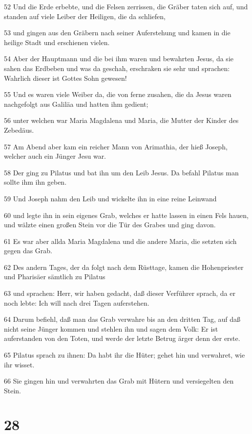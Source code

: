 \par 52 Und die Erde erbebte, und die Felsen zerrissen, die Gräber taten sich auf, und standen auf viele Leiber der Heiligen, die da schliefen,
\par 53 und gingen aus den Gräbern nach seiner Auferstehung und kamen in die heilige Stadt und erschienen vielen.
\par 54 Aber der Hauptmann und die bei ihm waren und bewahrten Jesus, da sie sahen das Erdbeben und was da geschah, erschraken sie sehr und sprachen: Wahrlich dieser ist Gottes Sohn gewesen!
\par 55 Und es waren viele Weiber da, die von ferne zusahen, die da Jesus waren nachgefolgt aus Galiläa und hatten ihm gedient;
\par 56 unter welchen war Maria Magdalena und Maria, die Mutter der Kinder des Zebedäus.
\par 57 Am Abend aber kam ein reicher Mann von Arimathia, der hieß Joseph, welcher auch ein Jünger Jesu war.
\par 58 Der ging zu Pilatus und bat ihn um den Leib Jesus. Da befahl Pilatus man sollte ihm ihn geben.
\par 59 Und Joseph nahm den Leib und wickelte ihn in eine reine Leinwand
\par 60 und legte ihn in sein eigenes Grab, welches er hatte lassen in einen Fels hauen, und wälzte einen großen Stein vor die Tür des Grabes und ging davon.
\par 61 Es war aber allda Maria Magdalena und die andere Maria, die setzten sich gegen das Grab.
\par 62 Des andern Tages, der da folgt nach dem Rüsttage, kamen die Hohenpriester und Pharisäer sämtlich zu Pilatus
\par 63 und sprachen: Herr, wir haben gedacht, daß dieser Verführer sprach, da er noch lebte: Ich will nach drei Tagen auferstehen.
\par 64 Darum befiehl, daß man das Grab verwahre bis an den dritten Tag, auf daß nicht seine Jünger kommen und stehlen ihn und sagen dem Volk: Er ist auferstanden von den Toten, und werde der letzte Betrug ärger denn der erste.
\par 65 Pilatus sprach zu ihnen: Da habt ihr die Hüter; gehet hin und verwahret, wie ihr wisset.
\par 66 Sie gingen hin und verwahrten das Grab mit Hütern und versiegelten den Stein.

\chapter{28}

